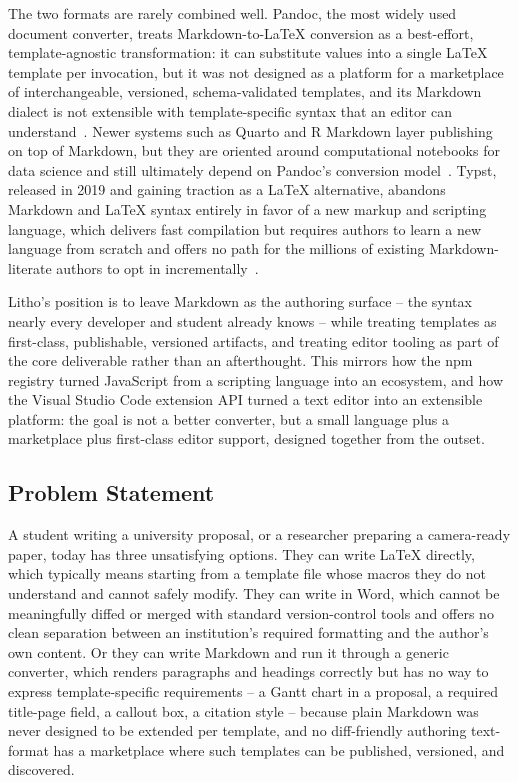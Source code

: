 \documentclass[a4paper,twoside]{article}
\begin{document}
The two formats are rarely combined well. Pandoc, the most widely used document converter, treats Markdown-to-LaTeX conversion as a best-effort, template-agnostic transformation: it can substitute values into a single LaTeX template per invocation, but it was not designed as a platform for a marketplace of interchangeable, versioned, schema-validated templates, and its Markdown dialect is not extensible with template-specific syntax that an editor can understand~\cite{ref3}. Newer systems such as Quarto and R Markdown layer publishing on top of Markdown, but they are oriented around computational notebooks for data science and still ultimately depend on Pandoc's conversion model~\cite{ref4}. Typst, released in 2019 and gaining traction as a LaTeX alternative, abandons Markdown and LaTeX syntax entirely in favor of a new markup and scripting language, which delivers fast compilation but requires authors to learn a new language from scratch and offers no path for the millions of existing Markdown-literate authors to opt in incrementally~\cite{ref5}.

Litho's position is to leave Markdown as the authoring surface -- the syntax nearly every developer and student already knows -- while treating templates as first-class, publishable, versioned artifacts, and treating editor tooling as part of the core deliverable rather than an afterthought. This mirrors how the npm registry turned JavaScript from a scripting language into an ecosystem, and how the Visual Studio Code extension API turned a text editor into an extensible platform: the goal is not a better converter, but a small language plus a marketplace plus first-class editor support, designed together from the outset.

\subsection{Problem Statement}

A student writing a university proposal, or a researcher preparing a camera-ready paper, today has three unsatisfying options. They can write LaTeX directly, which typically means starting from a template file whose macros they do not understand and cannot safely modify. They can write in Word, which cannot be meaningfully diffed or merged with standard version-control tools and offers no clean separation between an institution's required formatting and the author's own content. Or they can write Markdown and run it through a generic converter, which renders paragraphs and headings correctly but has no way to express template-specific requirements -- a Gantt chart in a proposal, a required title-page field, a callout box, a citation style -- because plain Markdown was never designed to be extended per template, and no diff-friendly authoring text-format has a marketplace where such templates can be published, versioned, and discovered.
\end{document}
